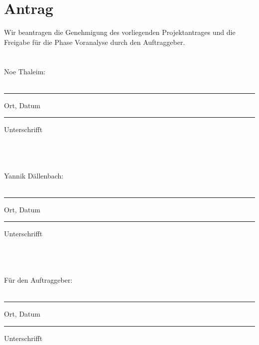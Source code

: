 \pagebreak
\section{Antrag}
	Wir beantragen die Genehmigung des vorliegenden Projektantrages und die Freigabe für die Phase Voranalyse durch den Auftraggeber.
	\\ \\ \\
	Noe Thaleim:
	\\ \\
	\parbox{4cm}{\hrule
	\strut \centering\footnotesize Ort, Datum} \hfill\parbox{4cm}{\hrule
	\strut \centering\footnotesize Unterschrifft}
	\\ \\ \\
	Yannik Dällenbach:
	\\ \\
	\parbox{4cm}{\hrule
	\strut \centering\footnotesize Ort, Datum} \hfill\parbox{4cm}{\hrule
	\strut \centering\footnotesize Unterschrifft}
	\\ \\ \\
	Für den Auftraggeber:
	\\ \\
	\parbox{4cm}{\hrule
	\strut \centering\footnotesize Ort, Datum} \hfill\parbox{4cm}{\hrule
	\strut \centering\footnotesize Unterschrifft}
